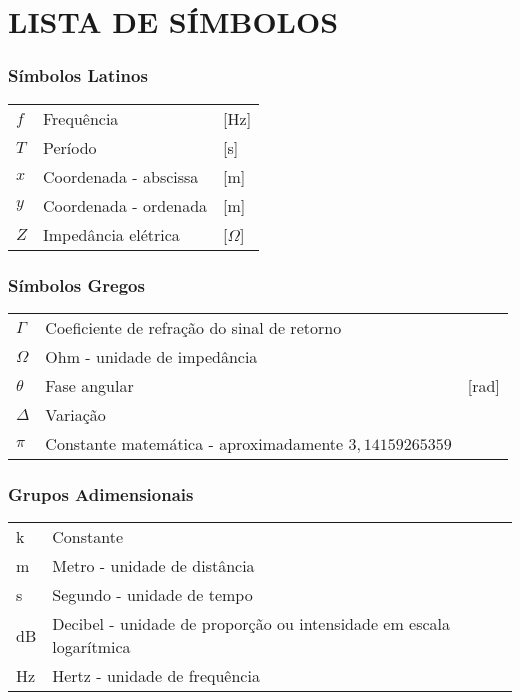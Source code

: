 




\chapter*{LISTA DE SÍMBOLOS}




\subsection*{Símbolos Latinos}

\begin{tabular}{p{}p{}>{\PreserveBacklash\raggedleft}p{}}
$f$ & Frequência  & {[}Hz{]}\tabularnewline
$T$ & Período & {[}s{]} \tabularnewline
$x$ & Coordenada - abscissa & {[}m{]} \tabularnewline
$y$ & Coordenada - ordenada & {[}m{]} \tabularnewline
$Z$ & Impedância elétrica & {[}$\Omega${]} \tabularnewline
\end{tabular}


\subsection*{Símbolos Gregos}

\begin{tabular}{p{}p{}>{\PreserveBacklash\raggedleft}p{}}
$\Gamma$ & Coeficiente de refração do sinal de retorno \tabularnewline
$\Omega$ & Ohm - unidade de impedância \tabularnewline
$\theta$ & Fase angular & {[}rad{]} \tabularnewline
$\Delta$ & Variação \tabularnewline
$\pi$ & Constante matemática - aproximadamente $3,14159265359$ \tabularnewline
\end{tabular}


\subsection*{Grupos Adimensionais}

\begin{tabular}{p{}p{}}
k & Constante\tabularnewline
m & Metro - unidade de distância \tabularnewline
s & Segundo - unidade de tempo \tabularnewline
dB & Decibel - unidade de proporção ou intensidade em escala logarítmica \tabularnewline
Hz & Hertz - unidade de frequência
\end{tabular}


